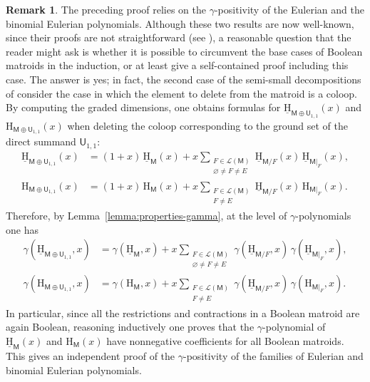 \documentclass[11pt, a4paper, english]{amsart}
\theoremstyle{teoremas}
\theoremstyle{definition}
\newtheorem{remark}[theorem]{Remark}
\newcommand{\M}{\mathsf{M}}
\newcommand{\U}{\mathsf{U}}
\renewcommand{\H}{\mathrm{H}}
\newcommand{\uH}{\underline{\mathrm{H}}}
\begin{document}
\begin{remark}\label{remark:with-coloop}
    The preceding proof relies on the $\gamma$-positivity of the Eulerian and the binomial Eulerian polynomials. Although these two results are now well-known, since their proofs are not straightforward (see \cite[Section~11]{postnikov-reiner-williams}), a reasonable question that the reader might ask is whether it is possible to circumvent the base cases of Boolean matroids in the induction, or at least give a self-contained proof including this case. The answer is yes; in fact, the second case of the semi-small decompositions of \cite[Theorem~1.2 and Theorem~1.5]{semismall} consider the case in which the element to delete from the matroid is a coloop. By computing the graded dimensions, one obtains formulas for $\uH_{\M\oplus\U_{1,1}}(x)$ and $\H_{\M\oplus\U_{1,1}}(x)$ when deleting the coloop corresponding to the ground set of the direct summand $\U_{1,1}$:
        \begin{align*}
        \uH_{\M\oplus\U_{1,1}}(x) &= (1+x)\,\uH_{\M}(x) + x\sum_{\substack{F\in\mathcal{L}(\M)\\\varnothing\neq F\neq E}} \uH_{\M/F}(x)\, \uH_{\M|_F}(x),\\
        \H_{\M\oplus\U_{1,1}}(x) &= (1+x)\,\H_{\M}(x) + x\sum_{\substack{F\in\mathcal{L}(\M)\\F\neq E}} \uH_{\M/F}(x) \,\H_{\M|_F}(x).
        \end{align*}
    Therefore, by Lemma~\ref{lemma:properties-gamma}, at the level of $\gamma$-polynomials one has
    \begin{align*}
        \gamma(\uH_{\M\oplus\U_{1,1}},x) &= \gamma(\uH_{\M},x) + x\sum_{\substack{F\in\mathcal{L}(\M)\\\varnothing\neq F\neq E}} \gamma(\uH_{\M/F},x)\, \gamma(\uH_{\M|_F},x),\\
        \gamma(\H_{\M\oplus\U_{1,1}},x) &= \gamma(\H_{\M},x) + x\sum_{\substack{F\in\mathcal{L}(\M)\\F\neq E}} \gamma(\uH_{\M/F},x) \,\gamma(\H_{\M|_F},x).
        \end{align*}
    In particular, since all the restrictions and contractions in a Boolean matroid are again Boolean, reasoning inductively one proves that the $\gamma$-polynomial of $\uH_{\M}(x)$ and $\H_{\M}(x)$ have nonnegative coefficients for all Boolean matroids. This gives an independent proof of the $\gamma$-positivity of the families of Eulerian and binomial Eulerian polynomials.
\end{remark}
\end{document}
